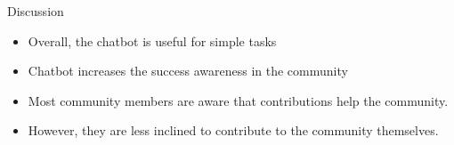  
%       
   
   

\begin{frame}{Discussion}
  \begin{itemize}
    \item Overall, the chatbot is useful for simple tasks
    \item Chatbot increases the success awareness in the community
    \item Most community members are aware that contributions help the community.
    \item However, they are less inclined to contribute to the community themselves.
    
  \end{itemize}
\end{frame}



